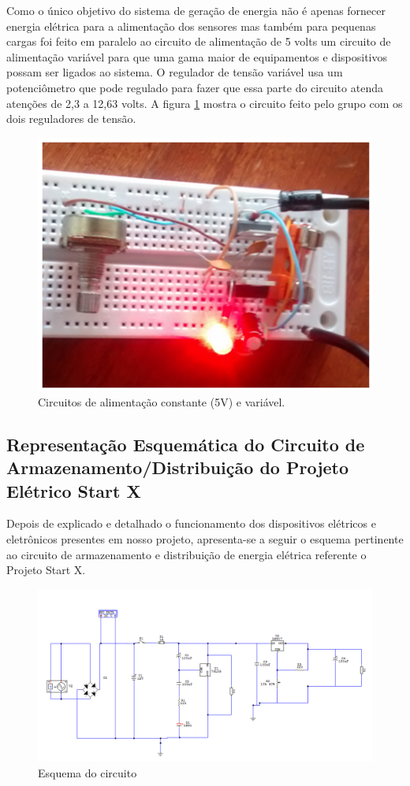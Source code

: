 Como o único objetivo do sistema de geração de energia não é apenas fornecer energia elétrica para a alimentação dos sensores mas também para pequenas cargas foi feito em paralelo ao circuito de alimentação de 5 volts um circuito de alimentação variável para que uma gama maior de equipamentos e dispositivos possam ser ligados ao sistema. O regulador de tensão variável usa um potenciômetro que pode regulado para fazer que essa parte do circuito atenda atenções de 2,3 a 12,63 volts. A figura \ref{circuito-alimentacao} mostra o circuito feito pelo grupo com os dois reguladores de tensão.

\begin{figure}[h]
	\centering
	\includegraphics[scale=0.7] {figuras/circuito-alimentacao.png}
	\caption{Circuitos de alimentação constante (5V) e variável. }
	\label{circuito-alimentacao}
\end{figure}

\subsection{Representação Esquemática do Circuito  de Armazenamento/Distribuição do Projeto Elétrico Start X}

Depois de explicado e detalhado o funcionamento dos dispositivos elétricos e eletrônicos presentes em nosso projeto, apresenta-se a seguir o esquema pertinente ao circuito de armazenamento e distribuição de energia elétrica referente o Projeto Start X. 

\begin{figure}[h]
	\centering
	\includegraphics[scale=0.5]		{figuras/circuito.png}
	\caption{Esquema do circuito}
	\label{ciruito}
\end{figure}
